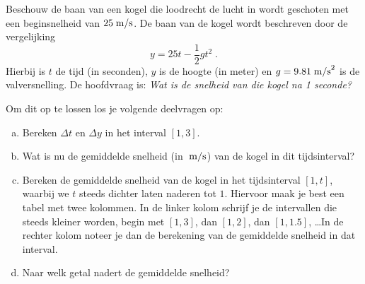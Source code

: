 \documentclass[12pt]{article}
\begin{document}
\begin{oefening}
  Beschouw de baan van een kogel die loodrecht de lucht in wordt geschoten met een beginsnelheid van $25\;\mbox{m/s}$. De baan van de kogel wordt beschreven door de vergelijking
  $$y=25t-\frac{1}{2}gt^2\;.$$
  Hierbij is $t$ de tijd (in seconden), $y$ is de hoogte (in meter) en $g=9.81\;\mbox{m/s}^2$ is de valversnelling. De hoofdvraag is: {\em Wat is de snelheid van die kogel na 1 seconde?}

  Om dit op te lossen los je volgende deelvragen op:
  \begin{enumerate}[(a)]
  \item Bereken $\Delta t$ en $\Delta y$ in het interval $[1,3]$.
  \item Wat is nu de gemiddelde snelheid (in $\;\mbox{m/s}$) van de kogel in dit tijdsinterval?
  \item Bereken de gemiddelde snelheid van de kogel in het tijdsinterval $[1,t]$, waarbij we $t$ steeds dichter laten naderen tot $1$. Hiervoor maak je best een tabel met twee kolommen. In de linker kolom schrijf je de intervallen die steeds kleiner worden, begin met $[1,3]$, dan $[1,2]$, dan $[1,1.5]$, \ldots In de rechter kolom noteer je dan de berekening van de gemiddelde snelheid in dat interval.
  \item Naar welk getal nadert de gemiddelde snelheid?
  \end{enumerate}
\end{oefening}
\end{document}
